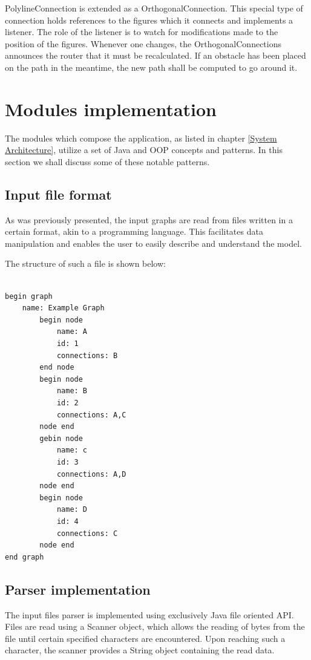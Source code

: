 PolylineConnection is extended as a OrthogonalConnection. This special type of connection holds references to the 
figures which it connects and implements a listener. The role of the listener is to watch for modifications made 
to the position of the figures. Whenever one changes, the OrthogonalConnections announces the router that it 
must be recalculated. If an obstacle has been placed on the path in the meantime, the new path shall be computed 
to go around it.

\section{Modules implementation}

The modules which compose the application, as listed in chapter \ref{System Architecture}, utilize a set of Java 
and OOP concepts and patterns. In this section we shall discuss some of these notable patterns.

\subsection{Input file format}

As was previously presented, the input graphs are read from files written in a certain format, akin to a programming 
language. This facilitates data manipulation and enables the user to easily describe and understand the model. 

The structure of such a file is shown below:

\begin{lstlisting}[caption=Input file example]

begin graph
    name: Example Graph
        begin node
            name: A
            id: 1
            connections: B
        end node
        begin node
            name: B
            id: 2
            connections: A,C
        node end
        gebin node
            name: c
            id: 3
            connections: A,D
        node end
       	begin node
            name: D
            id: 4
            connections: C
        node end
end graph

\end{lstlisting}

\subsection{Parser implementation}

The input files parser is implemented using exclusively Java file oriented API. Files are read using a Scanner object, 
which allows the reading of bytes from the file until certain specified characters are encountered. Upon reaching 
such a character, the scanner provides a String object containing the read data. 

